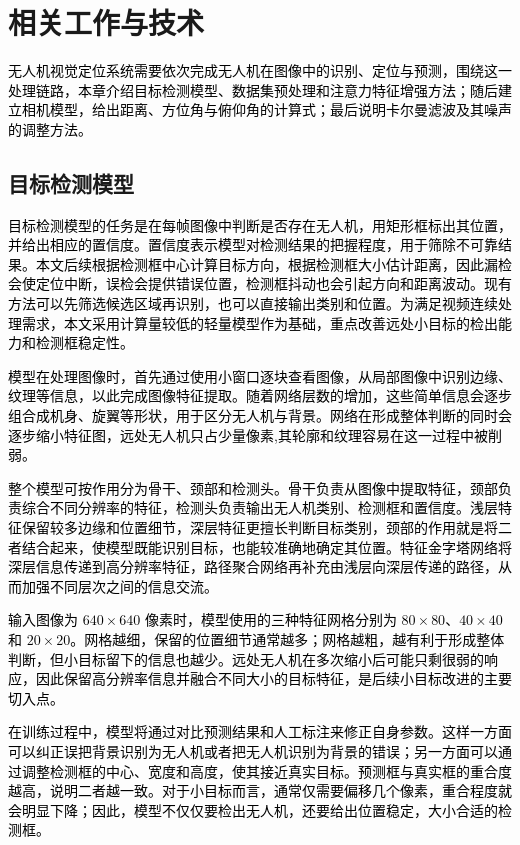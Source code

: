 \chapter{相关工作与技术}

\textcolor{black}{无人机视觉定位系统需要依次完成无人机在图像中的识别、定位与预测，围绕这一处理链路，本章介绍目标检测模型、数据集预处理和注意力特征增强方法；随后建立相机模型，给出距离、方位角与俯仰角的计算式；最后说明卡尔曼滤波及其噪声的调整方法。}

\section{目标检测模型}

\textcolor{black}{目标检测模型的任务是在每帧图像中判断是否存在无人机，用矩形框标出其位置，并给出相应的置信度。置信度表示模型对检测结果的把握程度，用于筛除不可靠结果。本文后续根据检测框中心计算目标方向，根据检测框大小估计距离，因此漏检会使定位中断，误检会提供错误位置，检测框抖动也会引起方向和距离波动。现有方法可以先筛选候选区域再识别，也可以直接输出类别和位置\cite{bala2025review}。为满足视频连续处理需求，本文采用计算量较低的轻量模型作为基础，重点改善远处小目标的检出能力和检测框稳定性\cite{yolov8_mpeb}。}

\textcolor{black}{模型在处理图像时，首先通过使用小窗口逐块查看图像，从局部图像中识别边缘、纹理等信息，以此完成图像特征提取。随着网络层数的增加，这些简单信息会逐步组合成机身、旋翼等形状，用于区分无人机与背景。网络在形成整体判断的同时会逐步缩小特征图，远处无人机只占少量像素,其轮廓和纹理容易在这一过程中被削弱。}

\textcolor{black}{整个模型可按作用分为骨干、颈部和检测头。骨干负责从图像中提取特征，颈部负责综合不同分辨率的特征，检测头负责输出无人机类别、检测框和置信度。浅层特征保留较多边缘和位置细节，深层特征更擅长判断目标类别，颈部的作用就是将二者结合起来，使模型既能识别目标，也能较准确地确定其位置。特征金字塔网络将深层信息传递到高分辨率特征，路径聚合网络再补充由浅层向深层传递的路径，从而加强不同层次之间的信息交流\cite{fpn,panet}。}

\textcolor{black}{输入图像为 $640\times640$ 像素时，模型使用的三种特征网格分别为 $80\times80$、$40\times40$ 和 $20\times20$。网格越细，保留的位置细节通常越多；网格越粗，越有利于形成整体判断，但小目标留下的信息也越少。远处无人机在多次缩小后可能只剩很弱的响应，因此保留高分辨率信息并融合不同大小的目标特征，是后续小目标改进的主要切入点。}

\textcolor{black}{在训练过程中，模型将通过对比预测结果和人工标注来修正自身参数。这样一方面可以纠正误把背景识别为无人机或者把无人机识别为背景的错误；另一方面可以通过调整检测框的中心、宽度和高度，使其接近真实目标。预测框与真实框的重合度越高，说明二者越一致。对于小目标而言，通常仅需要偏移几个像素，重合程度就会明显下降；因此，模型不仅仅要检出无人机，还要给出位置稳定，大小合适的检测框。}

